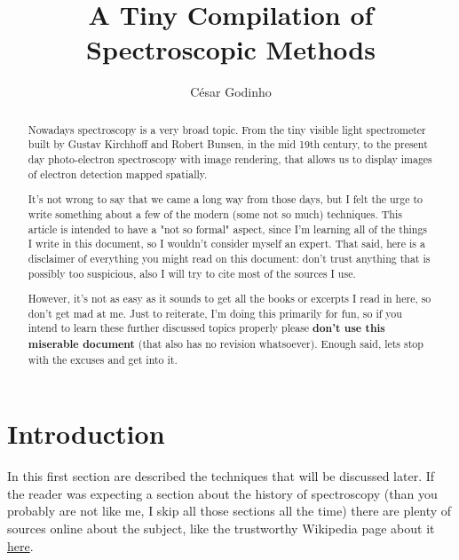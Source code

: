 \documentclass[]{report}
\begin{document}
\title{A Tiny Compilation of Spectroscopic Methods}
\author{César Godinho}
\maketitle

\newpage

\begin{abstract}
Nowadays spectroscopy is a very broad topic. From the tiny visible light spectrometer built by Gustav Kirchhoff and Robert Bunsen, in the mid 19th century, to the present day photo-electron spectroscopy with image rendering, that allows us to display images of electron detection mapped spatially.
\par It's not wrong to say that we came a long way from those days, but I felt the urge to write something about a few of the modern (some not so much) techniques. This article is intended to have a "not so formal" aspect, since I'm learning all of the things I write in this document, so I wouldn't consider myself an expert. That said, here is a disclaimer of everything you might read on this document: don't trust anything that is possibly too suspicious, also I will try to cite most of the sources I use. \par However, it's not as easy as it sounds to get all the books or excerpts I read in here, so don't get mad at me. Just to reiterate, I'm doing this primarily for fun, so if you intend to learn these further discussed topics properly please \textbf{don't use this miserable document} (that also has no revision whatsoever). Enough said, lets stop with the excuses and get into it.
\end{abstract}

\newpage

\chapter{Introduction}

In this first section are described the techniques that will be discussed later. If the reader was expecting a section about the history of spectroscopy (than you probably are not like me, I skip all those sections all the time) there are plenty of sources online about the subject, like the trustworthy Wikipedia page about it \href{https://en.wikipedia.org/wiki/History_of_spectroscopy}{here}.
\end{document}
